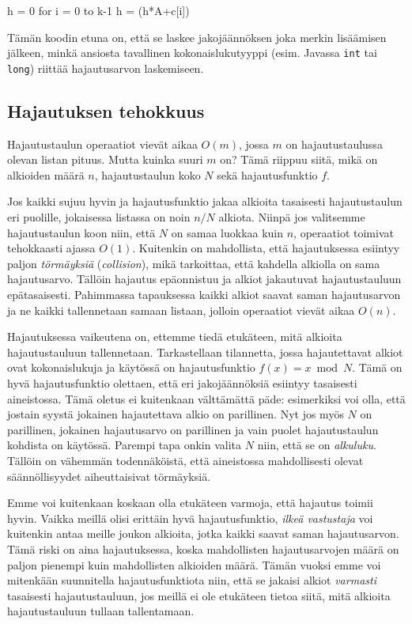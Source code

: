 \begin{code}
h = 0
for i = 0 to k-1
    h = (h*A+c[i])%
\end{code}

Tämän koodin etuna on, että se laskee jakojäännöksen joka
merkin lisää\-misen jälkeen, minkä ansiosta tavallinen kokonaislukutyyppi
(esim. Javassa \texttt{int} tai \texttt{long}) riittää hajautusarvon laskemiseen.

\subsection{Hajautuksen tehokkuus}

Hajautustaulun operaatiot vievät aikaa $O(m)$,
jossa $m$ on hajautustaulussa olevan listan pituus.
Mutta kuinka suuri $m$ on? Tämä riippuu siitä,
mikä on alkioiden määrä $n$, hajautustaulun koko $N$
sekä hajautusfunktio $f$.

Jos kaikki sujuu hyvin ja hajautusfunktio jakaa alkioita
tasaisesti hajautustaulun eri puolille,
jokaisessa listassa on noin $n/N$ alkiota.
Niinpä jos valitsemme hajautustaulun koon niin,
että $N$ on samaa luokkaa kuin $n$,
operaatiot toimivat tehokkaasti ajassa $O(1)$.
Kuitenkin on mahdollista, että hajautuksessa esiintyy
paljon \emph{törmäyksiä} (\emph{collision}),
mikä tarkoittaa, että kahdella alkiolla on sama hajautusarvo.
Tällöin hajautus epäonnistuu
ja alkiot jakautuvat hajautustauluun epätasaisesti.
Pahimmassa tapauksessa kaikki alkiot saavat saman
hajautusarvon ja ne kaikki tallennetaan samaan listaan,
jolloin operaatiot vievät aikaa $O(n)$.

Hajautuksessa vaikeutena on, ettemme tiedä etukäteen,
mitä alkioita hajautustauluun tallennetaan.
Tarkastellaan tilannetta,
jossa hajautettavat alkiot ovat kokonaislukuja
ja käytössä on hajautusfunktio $f(x) = x \bmod N$.
Tämä on hyvä hajautusfunktio olettaen,
että eri jakojäännöksiä esiintyy tasaisesti aineistossa.
Tämä oletus ei kuitenkaan välttämättä päde:
esimerkiksi voi olla, että jostain syystä
jokainen hajautettava alkio on parillinen.
Nyt jos myös $N$ on parillinen, jokainen hajautusarvo
on parillinen ja vain puolet hajautustaulun kohdista on käytössä.
Parempi tapa onkin valita $N$ niin, että se on \emph{alkuluku}.
Tällöin on vähemmän todennäköistä,
että aineistossa mahdollisesti olevat säännöllisyydet
aiheuttaisivat törmäyksiä.

Emme voi kuitenkaan koskaan olla etukäteen varmoja,
että hajautus toimii hyvin.
Vaikka meillä olisi erittäin hyvä hajautusfunktio,
\emph{ilkeä vastustaja} voi kuitenkin antaa
meille joukon alkioita, jotka kaikki saavat saman hajautusarvon.
Tämä riski on aina hajautuksessa, koska mahdollisten
hajautusarvojen määrä on paljon pienempi kuin mahdollisten alkioiden määrä.
Tämän vuoksi emme voi mitenkään suunnitella hajautusfunktiota niin,
että se jakaisi alkiot \emph{varmasti} tasaisesti hajautustauluun,
jos meillä ei ole etukäteen tietoa siitä,
mitä alkioita hajautustauluun tullaan tallentamaan.

